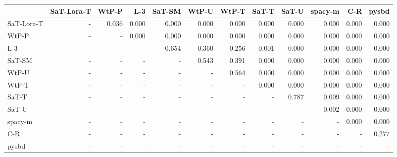 \begin{tabular}{lrrrrrrrrrrr}
\toprule
 & SaT-Lora-T & WtP-P & L-3 & SaT-SM & WtP-U & WtP-T & SaT-T & SaT-U & spacy-m & C-R & pysbd \\
\midrule
SaT-Lora-T & - & 0.036 & 0.000 & 0.000 & 0.000 & 0.000 & 0.000 & 0.000 & 0.000 & 0.000 & 0.000 \\
WtP-P & - & - & 0.000 & 0.000 & 0.000 & 0.000 & 0.000 & 0.000 & 0.000 & 0.000 & 0.000 \\
L-3 & - & - & - & 0.654 & 0.360 & 0.256 & 0.001 & 0.000 & 0.000 & 0.000 & 0.000 \\
SaT-SM & - & - & - & - & 0.543 & 0.391 & 0.000 & 0.000 & 0.000 & 0.000 & 0.000 \\
WtP-U & - & - & - & - & - & 0.564 & 0.000 & 0.000 & 0.000 & 0.000 & 0.000 \\
WtP-T & - & - & - & - & - & - & 0.000 & 0.000 & 0.000 & 0.000 & 0.000 \\
SaT-T & - & - & - & - & - & - & - & 0.787 & 0.009 & 0.000 & 0.000 \\
SaT-U & - & - & - & - & - & - & - & - & 0.002 & 0.000 & 0.000 \\
spacy-m & - & - & - & - & - & - & - & - & - & 0.000 & 0.000 \\
C-R & - & - & - & - & - & - & - & - & - & - & 0.277 \\
pysbd & - & - & - & - & - & - & - & - & - & - & - \\
\bottomrule
\end{tabular}

